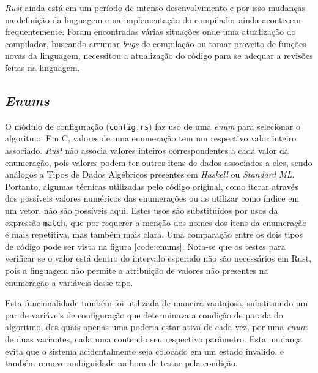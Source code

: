 \documentclass[tg]{mdtufsm}
\def\Cpp{{C\nolinebreak[4]\raisebox{.20ex}{\small\bf++}}}
\begin{document}
\emph{Rust} ainda está em um período de intenso desenvolvimento e por isso mudanças na definição da linguagem e na implementação do compilador ainda acontecem frequentemente. Foram encontradas várias situações onde uma atualização do compilador, buscando arrumar \emph{bugs} de compilação ou tomar proveito de funções novas da linguagem, necessitou a atualização do código para se adequar a revisões feitas na linguagem.

\subsection{\emph{Enums}}

O módulo de configuração (\texttt{config.rs}) faz uso de uma \emph{enum} para selecionar o algoritmo. Em \Cpp, valores de uma enumeração tem um respectivo valor inteiro associado. \emph{Rust} não associa valores inteiros correspondentes a cada valor da enumeração, pois valores podem ter outros itens de dados associados a eles, sendo análogos a Tipos de Dados Algébricos presentes em \emph{Haskell} ou \emph{Standard ML}.  Portanto, algumas técnicas utilizadas pelo código original, como iterar através dos possíveis valores numéricos das enumerações ou as utilizar como índice em um vetor, não são possíveis aqui. Estes usos são substituídos por usos da expressão \texttt{match}, que por requerer a menção dos nomes dos itens da enumeração é mais repetitiva, mas também mais clara. Uma comparação entre os dois tipos de código pode ser vista na figura \ref{code:enums}. Nota-se que os testes para verificar se o valor está dentro do intervalo esperado não são necessários em Rust, pois a linguagem não permite a atribuição de valores não presentes na enumeração a variáveis desse tipo.

Esta funcionalidade também foi utilizada de maneira vantajosa, substituindo um par de variáveis de configuração que determinava a condição de parada do algoritmo, dos quais apenas uma poderia estar ativa de cada vez, por uma \emph{enum} de duas variantes, cada uma contendo seu respectivo parâmetro. Esta mudança evita que o sistema acidentalmente seja colocado em um estado inválido, e também remove ambiguidade na hora de testar pela condição.
\end{document}
